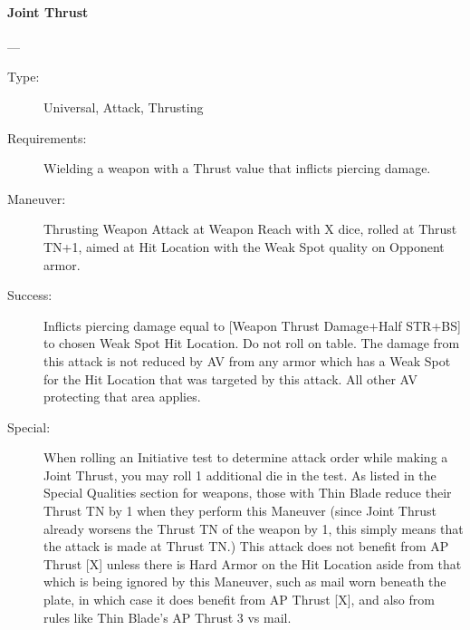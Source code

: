 \documentclass[oneside,11pt,english]{book}
\begin{document}
\paragraph{\large\label{man:Joint Thrust}Joint Thrust}---\quad{\large[X+2]}
\vspace{-10pt}\begin{description} 
\item [Type:] Universal, Attack, Thrusting 
\item [Requirements:] Wielding a weapon with a Thrust value that inflicts piercing damage. 
\item [Maneuver:] Thrusting Weapon Attack at Weapon Reach with X dice, rolled at
  Thrust TN+1, aimed at Hit Location with the Weak Spot quality on Opponent
  armor.  
\item [Success:] Inflicts piercing damage equal to [Weapon Thrust Damage+Half
  STR+BS] to chosen Weak Spot Hit Location. Do not roll on table. The damage
  from this attack is not reduced by AV from any armor which has a Weak Spot for
  the Hit Location that was targeted by this attack. All other AV protecting
  that area applies.
\item [Special:] When rolling an Initiative test to determine attack order while
  making a Joint Thrust, you may roll 1 additional die in the test.  
  As listed in the Special Qualities section for weapons, those with Thin Blade reduce their Thrust TN by 1 
  when they perform this Maneuver (since Joint Thrust already worsens the Thrust TN of the weapon by 1, 
  this simply means that the attack is made at Thrust TN.) 
  This attack does not benefit from AP Thrust [X] unless there is Hard Armor on the Hit Location aside 
  from that which is being ignored by this Maneuver, such as mail worn beneath the plate, in which case it 
  does benefit from AP Thrust [X], and also from rules like Thin Blade’s AP Thrust 3 vs mail. 
\end{description}
\end{document}
